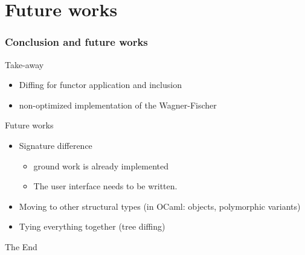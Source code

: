 \documentclass[11pt,aspectratio=169]{beamer}
\begin{document}
\section{Future works}

\begin{frame}\frametitle{Conclusion and future works}
  \begin{block}{Take-away}
    \begin{itemize}
      \item Diffing for functor application and inclusion
      \item non-optimized implementation of the Wagner-Fischer
  \end{itemize}
\end{block}

\begin{block}{Future works}
  \begin{itemize}

    \item Signature difference
      \begin{itemize}
        \item ground work is already implemented
        \item The user interface needs to be written.
      \end{itemize}
    \item Moving to other structural types (in OCaml: objects, polymorphic variants)
    \item Tying everything together (tree diffing)
  \end{itemize}
\end{block}
\end{frame}

\begin{frame}[standout]
  \centering \Huge The End
\end{frame}
\end{document}
